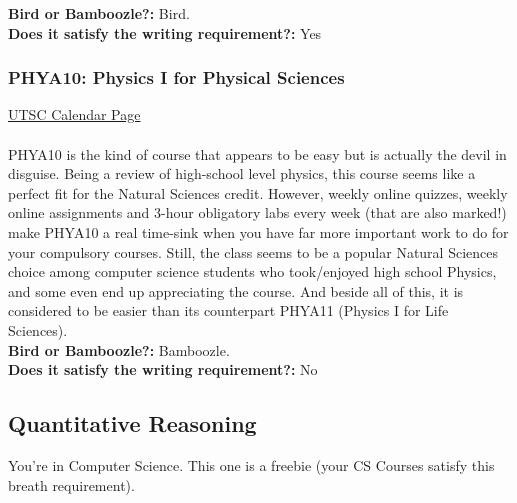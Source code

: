 \documentclass[11pt]{article}
\begin{document}
\textbf{Bird or Bamboozle?:} Bird.\\

\textbf{Does it satisfy the writing requirement?:} Yes

\subsubsection{PHYA10: Physics I for Physical Sciences}
\href{https://utsc.calendar.utoronto.ca/course/PHYA10H3}{UTSC Calendar Page}\\\\
PHYA10 is the kind of course that appears to be easy but is actually the devil in disguise. Being a review of high-school level physics, this course seems like a perfect fit for the Natural Sciences credit. However, weekly online quizzes, weekly online assignments and 3-hour obligatory labs every week (that are also marked!) make PHYA10 a real time-sink when you have far more important work to do for your compulsory courses. Still, the class seems to be a popular Natural Sciences choice among computer science students who took/enjoyed high school Physics, and some even end up appreciating the course. And beside all of this, it is considered to be easier than its counterpart PHYA11 (Physics I for Life Sciences). \\

\textbf{Bird or Bamboozle?:} Bamboozle.\\

\textbf{Does it satisfy the writing requirement?:} No

\subsection{Quantitative Reasoning}
You're in Computer Science. This one is a freebie (your CS Courses satisfy this breath requirement).
\end{document}
